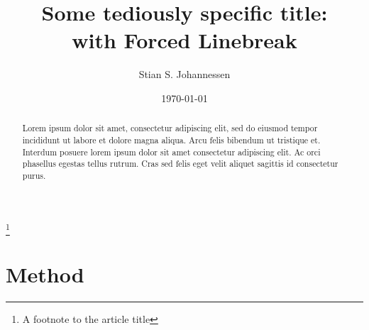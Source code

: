 \documentclass[10pt,a4paper,aps,twocolumn,secnumarabic,numerical,balancelastpage,nofootinbib,superscriptaddress]{revtex4-2}
\begin{document}

\title{Some tediously specific title:\\with Forced Linebreak}%
\thanks{A footnote to the article title}%

\author{Stian S. Johannessen}
\date{\today}

\begin{abstract}
	Lorem ipsum dolor sit amet, consectetur adipiscing elit, sed do eiusmod tempor incididunt ut labore et dolore magna aliqua. Arcu felis bibendum ut tristique et. Interdum posuere lorem ipsum dolor sit amet consectetur adipiscing elit. Ac orci phasellus egestas tellus rutrum. Cras sed felis eget velit aliquet sagittis id consectetur purus.
\end{abstract}

\maketitle

	\section{Method}
	
\end{document}
